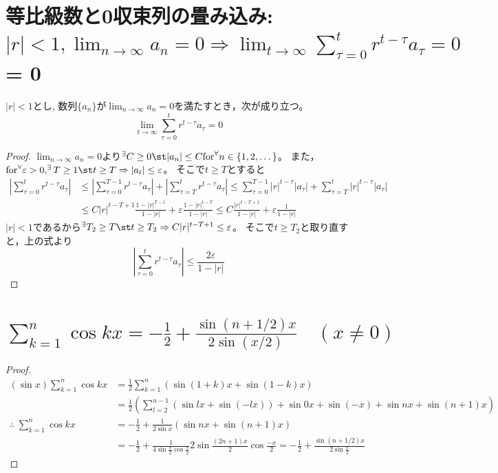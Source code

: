     \section{等比級数と0収束列の畳み込み: {\normalsize \texorpdfstring{$|r|<1,\lim_{n\to\infty}a_n=0 \Rightarrow \lim_{t\to\infty}\sum_{\tau=0}^t{r^{t-\tau}a_\tau}=0$}{|r|<1, lim\_\{n→∞\}a\_n=0 ⇒ lim\_\{t→∞\} Σ\_\{τ=0\}\string^t r\string^(t-τ) a\_τ} = 0}}
        \begin{shadebox}
            $|r|<1$とし, 数列$\{a_n\}$が$\lim_{n\to\infty}a_n=0$を満たすとき，次が成り立つ。
            \[\lim_{t\to\infty}\sum_{\tau=0}^t{r^{t-\tau}a_\tau}=0\]
        \end{shadebox}
        \begin{proof}
            \quad\par
            $\lim_{n\to\infty}a_n=0$より$^\exists C\geq 0\st|a_n|\leq C\mathrm{ for }^\forall n\in\{1,2,\dotsc\}$。
            また，$\mathrm{for }^\forall \varepsilon>0,^\exists T\geq 1\st t\geq T\Rightarrow|a_t|\leq\varepsilon$。
            そこで$t\geq T$とすると
            \begin{align*}
                \left|\sum_{\tau=0}^t{r^{t-\tau}a_\tau}\right| &\leq \left|\sum_{\tau=0}^{T-1}{r^{t-\tau}a_\tau}\right| + \left|\sum_{\tau=T}^t{r^{t-\tau}a_\tau}\right| \leq \sum_{\tau=0}^{T-1}|r|^{t-\tau}|a_\tau| + \sum_{\tau=T}^{t}|r|^{t-\tau}|a_\tau| \\
                &\leq C|r|^{t-T+1}\frac{1-|r|^{T-1}}{1-|r|} + \varepsilon\frac{1-|r|^{t-T}}{1-|r|} \leq C\frac{|r|^{t-T+1}}{1-|r|} + \varepsilon\frac{1}{1-|r|}
            \end{align*}
            $|r|<1$であるから$^\exists T_2\geq T\st t\geq T_2\Rightarrow C|r|^{t-T+1} \leq \varepsilon$。
            そこで$t\geq T_2$と取り直すと，上の式より
            \[\left|\sum_{\tau=0}^t{r^{t-\tau}a_\tau}\right| \leq \frac{2\varepsilon}{1-|r|}\]
        \end{proof}
    \section{\texorpdfstring{$\sum_{k=1}^n \cos kx = -\frac{1}{2} + \frac{\sin(n+1/2)x}{2\sin(x/2)} \quad (x\neq 0)$}{Σ\_\{k=1\}\string^n cos(kx) = -1/2 + (sin(n+1/2)x)/(2sin(x/2))}}
        \begin{proof}
            \begin{align*}
                (\sin x) \sum_{k=1}^n \cos kx &= \frac{1}{2}\sum_{k=1}^n (\sin(1+k)x+\sin(1-k)x) \\
                &= \frac{1}{2}\left(\sum_{l=2}^{n-1} (\sin lx + \sin(-lx)) + \sin 0x + \sin(-x) + \sin nx + \sin(n+1)x\right) \\
                \therefore\; \sum_{k=1}^n \cos kx &= -\frac{1}{2} + \frac{1}{2\sin x}(\sin nx + \sin(n+1)x) \\
                &= -\frac{1}{2} + \frac{1}{4\sin\frac{x}{2}\cos\frac{x}{2}}2\sin\frac{(2n+1)x}{2}\cos\frac{-x}{2} = -\frac{1}{2} + \frac{\sin(n+1/2)x}{2\sin\frac{x}{2}}
            \end{align*}
        \end{proof}
